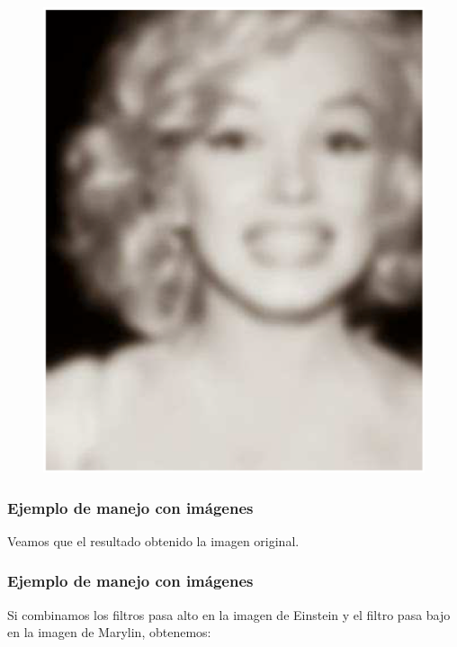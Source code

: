\begin{frame}[plain]
\begin{figure}
    \includegraphics[scale=0.25]{Imagenes/Marylin_02.eps}
\end{figure}
\end{frame}
\begin{frame}
\frametitle{Ejemplo de manejo con imágenes}
Veamos que el resultado obtenido  la imagen original.
\end{frame}
\begin{frame}
\frametitle{Ejemplo de manejo con imágenes}
Si combinamos los filtros pasa alto en la imagen de Einstein y el filtro pasa bajo en la imagen de Marylin, obtenemos:
\end{frame}
